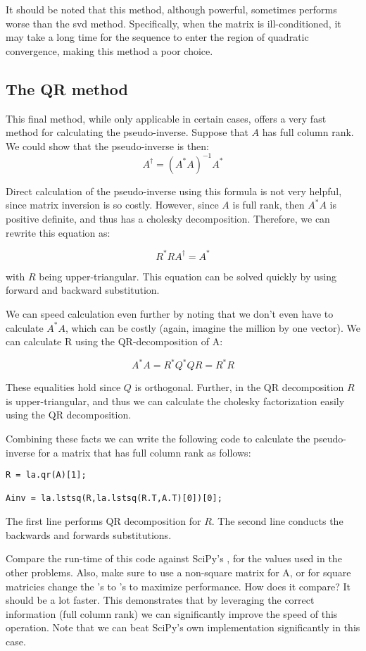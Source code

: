It should be noted that this method, although powerful, sometimes performs worse than the svd method. Specifically, when the matrix is ill-conditioned, it may take a long time for the sequence to enter the region of quadratic convergence, making this method a poor choice.

\subsection*{The QR method}

This final method, while only applicable in certain cases, offers a very fast method for calculating the pseudo-inverse. Suppose that $A$ has full column rank. We could show that the pseudo-inverse is then:
\[
A^\dagger = (A^* A)^{-1} A^*
\]

Direct calculation of the pseudo-inverse using this formula is not very helpful, since matrix inversion is so costly. However, since $A$ is full rank, then $A^*A$ is positive definite, and thus has a cholesky decomposition. Therefore, we can rewrite this equation as:

\[
R^*R A^\dagger = A^*
\]

with $R$ being upper-triangular. This equation can be solved quickly by using forward and backward substitution.

We can speed calculation even further by noting that we don't even have to calculate $A^* A$, which can be costly (again, imagine the million by one vector). We can calculate R using the QR-decomposition of A:

\[
A^* A = R^*Q^*QR = R^* R
\]

These equalities hold since $Q$ is orthogonal. Further, in the QR decomposition $R$ is upper-triangular, and thus we can calculate the cholesky factorization easily using the QR decomposition.

Combining these facts we can write the following code to calculate the pseudo-inverse for a matrix that has full column rank as follows:

\begin{lstlisting}
R = la.qr(A)[1];

Ainv = la.lstsq(R,la.lstsq(R.T,A.T)[0])[0];
\end{lstlisting}


The first line performs QR decomposition for $R$. The second line conducts the backwards and forwards substitutions.

\begin{problem}
Compare the run-time of this code against SciPy's , for the values used in the other problems. Also, make sure to use a non-square matrix for A, or for square matricies change the 's to 's to maximize performance.  How does it compare? It should be a lot faster. This demonstrates that by leveraging the correct information (full column rank) we can significantly improve the speed of this operation. Note that we can beat SciPy's own implementation significantly in this case.

\end{problem}

